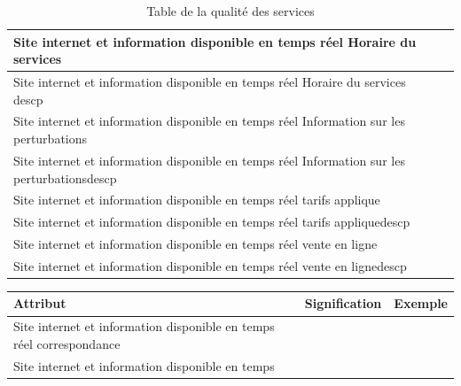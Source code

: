 \documentclass[a4paper]{report}
\begin{document}
\begin{doublespace}
\begin{table}[H]
\begin{center}
\begin{tabularx}{17.5cm}{|X|p{3cm}|p{1.5cm}|}
				\hline
				Site internet et information disponible en temps réel Horaire du
				services                                                              &                        &                  \\
				\hline
				Site internet et information disponible en temps réel Horaire du
				services descp                                                        &                        &                  \\
				\hline
				Site internet et information disponible en temps réel Information sur
				les perturbations                                                     &                        &                  \\
				\hline
				Site internet et information disponible en temps réel Information sur
				les perturbationsdescp                                                &                        &                  \\
				\hline
				Site internet et information disponible en temps réel tarifs applique &                        &                  \\
				\hline
				Site internet et information disponible en temps réel tarifs
				appliquedescp                                                         &                        &                  \\
				\hline
				Site internet et information disponible en temps réel vente en ligne  &                        &                  \\
				\hline
				Site internet et information disponible en temps réel vente en
				lignedescp                                                            &                        &                  \\
				\hline
			\end{tabularx}
			\caption{Table de la qualité des services}
		\end{center}
	\end{table}
	\begin{table}[H]
		\begin{center}
			\begin{tabularx}{17.5cm}{|X|p{3cm}|p{1.5cm}|}
				\hline
				\textbf{Attribut}                                                    & \textbf{Signification} & \textbf{Exemple} \\
				\hline
				Site internet et information disponible en temps réel correspondance &                        &                  \\
				\hline
				Site internet et information disponible en temps

\end{tabularx}
\end{center}
\end{table}
\end{doublespace}
\end{document}
